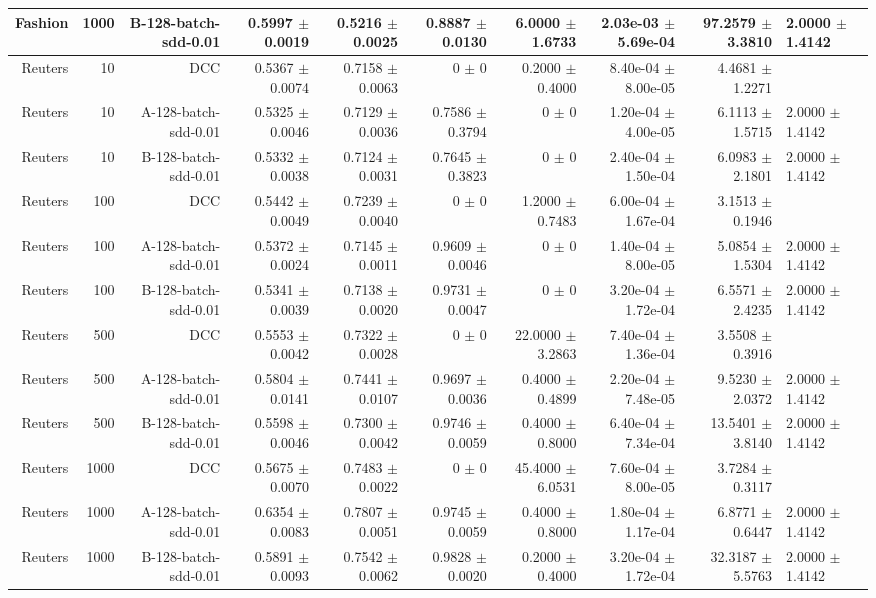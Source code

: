 \begin{table}[ht]
{\begin{tabular}{ | r | r | r | r | r | r | r | r | r |}
Fashion & 1000 & B-128-batch-sdd-0.01 & 0.5997 $\pm$ 0.0019 & 0.5216 $\pm$ 0.0025 & 0.8887 $\pm$ 0.0130 & 6.0000 $\pm$ 1.6733 & 2.03e-03 $\pm$ 5.69e-04 & 97.2579 $\pm$ 3.3810 & 2.0000 $\pm$ 1.4142 \\ \hline 
Reuters & 10 & DCC & 0.5367 $\pm$ 0.0074 & 0.7158 $\pm$ 0.0063 & 0 $\pm$ 0 & 0.2000 $\pm$ 0.4000 & 8.40e-04 $\pm$ 8.00e-05 & 4.4681 $\pm$ 1.2271 \\ 
Reuters & 10 & A-128-batch-sdd-0.01 & 0.5325 $\pm$ 0.0046 & 0.7129 $\pm$ 0.0036 & 0.7586 $\pm$ 0.3794 & 0 $\pm$ 0 & 1.20e-04 $\pm$ 4.00e-05 & 6.1113 $\pm$ 1.5715 & 2.0000 $\pm$ 1.4142 \\ \hdashline 
Reuters & 10 & B-128-batch-sdd-0.01 & 0.5332 $\pm$ 0.0038 & 0.7124 $\pm$ 0.0031 & 0.7645 $\pm$ 0.3823 & 0 $\pm$ 0 & 2.40e-04 $\pm$ 1.50e-04 & 6.0983 $\pm$ 2.1801 & 2.0000 $\pm$ 1.4142 \\ 
Reuters & 100 & DCC & 0.5442 $\pm$ 0.0049 & 0.7239 $\pm$ 0.0040 & 0 $\pm$ 0 & 1.2000 $\pm$ 0.7483 & 6.00e-04 $\pm$ 1.67e-04 & 3.1513 $\pm$ 0.1946 \\ \hdashline 
Reuters & 100 & A-128-batch-sdd-0.01 & 0.5372 $\pm$ 0.0024 & 0.7145 $\pm$ 0.0011 & 0.9609 $\pm$ 0.0046 & 0 $\pm$ 0 & 1.40e-04 $\pm$ 8.00e-05 & 5.0854 $\pm$ 1.5304 & 2.0000 $\pm$ 1.4142 \\ 
Reuters & 100 & B-128-batch-sdd-0.01 & 0.5341 $\pm$ 0.0039 & 0.7138 $\pm$ 0.0020 & 0.9731 $\pm$ 0.0047 & 0 $\pm$ 0 & 3.20e-04 $\pm$ 1.72e-04 & 6.5571 $\pm$ 2.4235 & 2.0000 $\pm$ 1.4142 \\ \hdashline 
Reuters & 500 & DCC & 0.5553 $\pm$ 0.0042 & 0.7322 $\pm$ 0.0028 & 0 $\pm$ 0 & 22.0000 $\pm$ 3.2863 & 7.40e-04 $\pm$ 1.36e-04 & 3.5508 $\pm$ 0.3916 \\ 
Reuters & 500 & A-128-batch-sdd-0.01 & 0.5804 $\pm$ 0.0141 & 0.7441 $\pm$ 0.0107 & 0.9697 $\pm$ 0.0036 & 0.4000 $\pm$ 0.4899 & 2.20e-04 $\pm$ 7.48e-05 & 9.5230 $\pm$ 2.0372 & 2.0000 $\pm$ 1.4142 \\ \hdashline 
Reuters & 500 & B-128-batch-sdd-0.01 & 0.5598 $\pm$ 0.0046 & 0.7300 $\pm$ 0.0042 & 0.9746 $\pm$ 0.0059 & 0.4000 $\pm$ 0.8000 & 6.40e-04 $\pm$ 7.34e-04 & 13.5401 $\pm$ 3.8140 & 2.0000 $\pm$ 1.4142 \\ 
Reuters & 1000 & DCC & 0.5675 $\pm$ 0.0070 & 0.7483 $\pm$ 0.0022 & 0 $\pm$ 0 & 45.4000 $\pm$ 6.0531 & 7.60e-04 $\pm$ 8.00e-05 & 3.7284 $\pm$ 0.3117 \\ \hdashline 
Reuters & 1000 & A-128-batch-sdd-0.01 & 0.6354 $\pm$ 0.0083 & 0.7807 $\pm$ 0.0051 & 0.9745 $\pm$ 0.0059 & 0.4000 $\pm$ 0.8000 & 1.80e-04 $\pm$ 1.17e-04 & 6.8771 $\pm$ 0.6447 & 2.0000 $\pm$ 1.4142 \\ 
Reuters & 1000 & B-128-batch-sdd-0.01 & 0.5891 $\pm$ 0.0093 & 0.7542 $\pm$ 0.0062 & 0.9828 $\pm$ 0.0020 & 0.2000 $\pm$ 0.4000 & 3.20e-04 $\pm$ 1.72e-04 & 32.3187 $\pm$ 5.5763 & 2.0000 $\pm$ 1.4142 \\ 
\hline
\end{tabular}
}
\end{table}